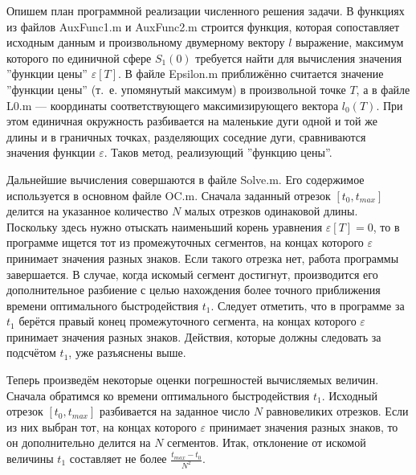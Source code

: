 \documentclass[12pt,titlepage]{article}
\begin{document}
Опишем план программной реализации численного решения задачи. В функциях из файлов AuxFunc1.m и  AuxFunc2.m строится функция,
которая сопоставляет исходным данным и произвольному двумерному вектору $ l $ выражение, максимум которого по
единичной сфере $ S_{1}(0) $ требуется найти для вычисления значения ''функции цены'' $ \varepsilon[T] $.
В файле Epsilon.m приближённо считается значение ''функции цены'' (т.~е. упомянутый максимум) в произвольной точке $ T $,
а в файле L0.m --- координаты соответствующего максимизирующего вектора $ l_{0}(T) $. При этом единичная окружность разбивается
на маленькие дуги одной и той же длины и в граничных точках, разделяющих соседние дуги, сравниваются значения функции
$ \varepsilon $. Таков метод, реализующий ''функцию цены''.

Дальнейшие вычисления совершаются в файле Solve.m. Его содержимое используется в основном файле OC.m. Сначала заданный отрезок
$ [ t_{0}, t_{max} ] $ делится на указанное количество $ N $ малых отрезков одинаковой длины. Поскольку здесь
нужно отыскать наименьший корень уравнения $ \varepsilon[T] = 0 $, то в программе ищется тот из промежуточных
сегментов, на концах которого $ \varepsilon $ принимает значения разных знаков. Если такого отрезка нет, работа
программы завершается. В случае, когда искомый сегмент достигнут, производится его дополнительное разбиение с
целью нахождения более точного приближения времени оптимального быстродействия $ t_{1} $. Следует отметить, что в
программе за $ t_{1} $ берётся правый конец промежуточного сегмента, на концах которого $ \varepsilon $ принимает
значения разных знаков. Действия, которые должны следовать за подсчётом $ t_{1} $, уже разъяснены выше.

Теперь произведём некоторые оценки погрешностей вычисляемых величин. Сначала обратимся ко времени оптимального
быстродействия $ t_{1} $. Исходный отрезок $ [ t_{0}, t_{max} ] $ разбивается на заданное число $ N $ равновеликих отрезков.
Если из них выбран тот, на концах которого $ \varepsilon $ принимает значения разных знаков, то он дополнительно
делится на $ N $ сегментов. Итак, отклонение от искомой величины $ t_{1} $ составляет не более
$ \frac{ t_{max} - t_{0} }{ N^{2} } $.
\end{document}
